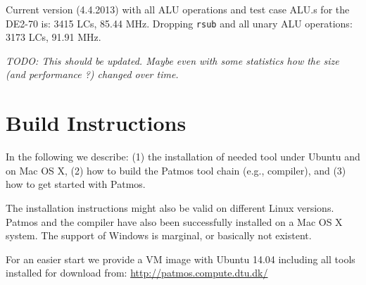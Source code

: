 \documentclass[a4paper,fontsize=10pt,twoside,DIV15,BCOR12mm,headinclude=true,footinclude=false,pagesize,bibtotoc]{scrbook}
\newcommand{\code}[1]{{\texttt{#1}}}
\newcommand{\todo}[1]{{\emph{TODO: #1}}}
\begin{document}
Current version (4.4.2013) with all ALU operations and test case ALU.s
for the DE2-70 is: 3415 LCs, 85.44 MHz. Dropping \code{rsub} and all unary
ALU operations: 3173 LCs, 91.91 MHz.

\todo{This should be updated. Maybe even with some statistics how the size
(and performance ?) changed over time.}


\chapter{Build Instructions}
\label{ch:build_instructions}

In the following we describe: (1) the installation of needed tool under Ubuntu and
on Mac OS X, (2) how to build the Patmos tool chain (e.g., compiler), and (3) how
to get started with Patmos.

The installation instructions might also be valid on different Linux versions.
Patmos and the compiler have also been successfully installed on a Mac OS X
system.  The support of Windows is marginal, or basically not existent.

For an easier start we provide a VM image with Ubuntu 14.04 including
all tools installed for download from: \url{http://patmos.compute.dtu.dk/}
\end{document}
